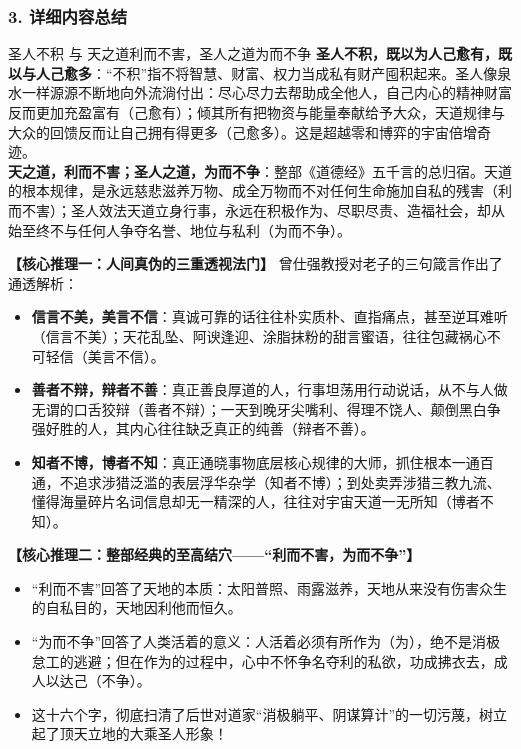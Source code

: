 \subsubsection{3. 详细内容总结}

\begin{ConceptBox}{圣人不积 与 天之道利而不害，圣人之道为而不争}
\textbf{圣人不积，既以为人己愈有，既以与人己愈多}：“不积”指不将智慧、财富、权力当成私有财产囤积起来。圣人像泉水一样源源不断地向外流淌付出：尽心尽力去帮助成全他人，自己内心的精神财富反而更加充盈富有（己愈有）；倾其所有把物资与能量奉献给予大众，天道规律与大众的回馈反而让自己拥有得更多（己愈多）。这是超越零和博弈的宇宙倍增奇迹。\\
\textbf{天之道，利而不害；圣人之道，为而不争}：整部《道德经》五千言的总归宿。天道的根本规律，是永远慈悲滋养万物、成全万物而不对任何生命施加自私的残害（利而不害）；圣人效法天道立身行事，永远在积极作为、尽职尽责、造福社会，却从始至终不与任何人争夺名誉、地位与私利（为而不争）。
\end{ConceptBox}

\noindent\textbf{【核心推理一：人间真伪的三重透视法门】}
曾仕强教授对老子的三句箴言作出了通透解析：
\begin{itemize}
    \item \textbf{信言不美，美言不信}：真诚可靠的话往往朴实质朴、直指痛点，甚至逆耳难听（信言不美）；天花乱坠、阿谀逢迎、涂脂抹粉的甜言蜜语，往往包藏祸心不可轻信（美言不信）。
    \item \textbf{善者不辩，辩者不善}：真正善良厚道的人，行事坦荡用行动说话，从不与人做无谓的口舌狡辩（善者不辩）；一天到晚牙尖嘴利、得理不饶人、颠倒黑白争强好胜的人，其内心往往缺乏真正的纯善（辩者不善）。
    \item \textbf{知者不博，博者不知}：真正通晓事物底层核心规律的大师，抓住根本一通百通，不追求涉猎泛滥的表层浮华杂学（知者不博）；到处卖弄涉猎三教九流、懂得海量碎片名词信息却无一精深的人，往往对宇宙天道一无所知（博者不知）。
\end{itemize}

\noindent\textbf{【核心推理二：整部经典的至高结穴——“利而不害，为而不争”】}
\begin{itemize}
    \item “利而不害”回答了天地的本质：太阳普照、雨露滋养，天地从来没有伤害众生的自私目的，天地因利他而恒久。
    \item “为而不争”回答了人类活着的意义：人活着必须有所作为（为），绝不是消极怠工的逃避；但在作为的过程中，心中不怀争名夺利的私欲，功成拂衣去，成人以达己（不争）。
    \item 这十六个字，彻底扫清了后世对道家“消极躺平、阴谋算计”的一切污蔑，树立起了顶天立地的大乘圣人形象！
\end{itemize}

